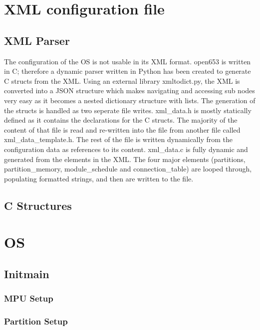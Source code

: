 \section{XML configuration file}

\subsection{XML Parser}

The configuration of the OS is not usable in its XML format. open653 is written in C; therefore a dynamic parser written in Python has been created to generate C structs from the XML.
Using an external library xmltodict.py, the XML is converted into a JSON structure which makes navigating and accessing sub nodes very easy as it becomes a nested dictionary structure with lists.
The generation of the structs is handled as two seperate file writes. xml\_data.h is mostly statically defined as it contains the declarations for the C structs. The majority of the content of that file is read and re-written into the file from another file called xml\_data\_template.h. The rest of the file is written dynamically from the configuration data as references to its content.
xml\_data.c is fully dynamic and generated from the elements in the XML. The four major elements (partitions, partition\_memory, module\_schedule and connection\_table) are looped through, populating formatted strings, and then are written to the file.

\subsection{C Structures}

\section{OS}

\subsection{Init\/main}

\subsubsection{MPU Setup}
\subsubsection{Partition Setup}
